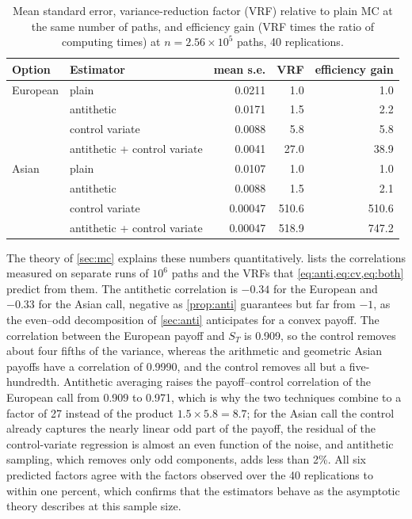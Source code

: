 \documentclass[11pt,a4paper]{article}
\begin{document}
\begin{table}[ht]
\centering
\caption{Mean standard error, variance-reduction factor (VRF) relative to plain MC at the same number of paths, and efficiency gain (VRF times the ratio of computing times) at $n=2.56\times10^5$ paths, 40 replications.}\label{tab:vrf}
\small
\begin{tabular}{llrrr}
\toprule
Option & Estimator & mean s.e. & VRF & efficiency gain \\
\midrule
European & plain & 0.0211 & 1.0 & 1.0 \\
 & antithetic & 0.0171 & 1.5 & 2.2 \\
 & control variate & 0.0088 & 5.8 & 5.8 \\
 & antithetic + control variate & 0.0041 & 27.0 & 38.9 \\
\midrule
Asian & plain & 0.0107 & 1.0 & 1.0 \\
 & antithetic & 0.0088 & 1.5 & 2.1 \\
 & control variate & 0.00047 & 510.6 & 510.6 \\
 & antithetic + control variate & 0.00047 & 518.9 & 747.2 \\
\bottomrule
\end{tabular}
\end{table}

The theory of \cref{sec:mc} explains these numbers quantitatively.
 lists the correlations measured on separate runs of $10^6$ paths and the VRFs that \cref{eq:anti,eq:cv,eq:both} predict from them.
The antithetic correlation is $-0.34$ for the European and $-0.33$ for the Asian call, negative as \cref{prop:anti} guarantees but far from $-1$, as the even--odd decomposition of \cref{sec:anti} anticipates for a convex payoff.
The correlation between the European payoff and $S_T$ is 0.909, so the control removes about four fifths of the variance, whereas the arithmetic and geometric Asian payoffs have a correlation of 0.9990, and the control removes all but a five-hundredth.
Antithetic averaging raises the payoff--control correlation of the European call from 0.909 to 0.971, which is why the two techniques combine to a factor of 27 instead of the product $1.5\times5.8 = 8.7$; for the Asian call the control already captures the nearly linear odd part of the payoff, the residual of the control-variate regression is almost an even function of the noise, and antithetic sampling, which removes only odd components, adds less than 2\%.
All six predicted factors agree with the factors observed over the 40 replications to within one percent, which confirms that the estimators behave as the asymptotic theory describes at this sample size.
\end{document}
